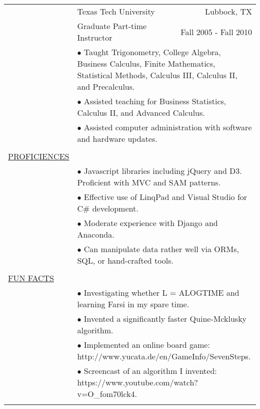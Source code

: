 \documentclass[11pt,oneside,letterpaper,titlepage,fleqn]{article}
\begin{document}
\hspace{-1em}\begin{tabular}[h]{@{}p{3.25cm}@{}lr}
						& Texas Tech University & Lubbock, TX\\
						& Graduate Part-time Instructor	 &  Fall 2005 - Fall 2010\\
           & \multicolumn{2}{p{14cm}}{$\bullet$ Taught Trigonometry, College Algebra, Business Calculus, Finite Mathematics, Statistical
Methods, Calculus III, Calculus II, and Precalculus.}\\
           & \multicolumn{2}{p{14cm}}{$\bullet$ Assisted teaching for Business Statistics, Calculus II, and Advanced Calculus.}\\
           & \multicolumn{2}{p{14cm}}{$\bullet$ Assisted computer administration with software and hardware updates.}\\
\\
\underline{PROFICIENCES}\\    
           & \multicolumn{2}{p{14cm}}{$\bullet$ Javascript libraries including jQuery and D3. Proficient with MVC and SAM patterns.}\\
           & \multicolumn{2}{p{14cm}}{$\bullet$ Effective use of LinqPad and Visual Studio for C\# development.}\\
           & \multicolumn{2}{p{14cm}}{$\bullet$ Moderate experience with Django and Anaconda.}\\					
           & \multicolumn{2}{p{14cm}}{$\bullet$ Can manipulate data rather well via ORMs, SQL, or hand-crafted tools.}\\						
\\
\underline{FUN FACTS}\\
           & \multicolumn{2}{p{14cm}}{$\bullet$ Investigating whether L = ALOGTIME and learning Farsi in my spare time.}\\
           & \multicolumn{2}{p{14cm}}{$\bullet$ Invented a significantly faster Quine-Mcklusky algorithm.}\\ 					
           & \multicolumn{2}{p{14cm}}{$\bullet$ Implemented an online board game: http://www.yucata.de/en/GameInfo/SevenSteps.}\\
          & \multicolumn{2}{p{14cm}}{$\bullet$ Screencast of an algorithm I invented: https://www.youtube.com/watch?v=O\_fom70lck4.}\\			          
\\					  				
\end{tabular}
\end{document}
